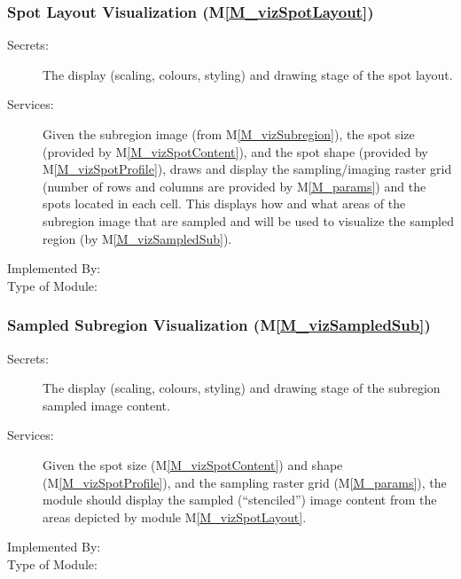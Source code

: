 \documentclass[12pt, titlepage]{article}
\newcommand{\mref}[1]{M\ref{#1}}
\begin{document}
\subsubsection{Spot Layout Visualization (\mref{M_vizSpotLayout})}
\begin{description}
\item[Secrets:]The display (scaling, colours, styling) and drawing stage of the spot layout.
\item[Services:]Given the subregion image (from \mref{M_vizSubregion}), 
  the spot size (provided by \mref{M_vizSpotContent}),
  and the spot shape (provided by \mref{M_vizSpotProfile}),
  draws and display the sampling/imaging raster grid
  (number of rows and columns are provided by \mref{M_params}) and
  the spots located in each cell. This displays how and what areas of the subregion
  image that are sampled and will be used to visualize the 
  sampled region (by \mref{M_vizSampledSub}).
\item[Implemented By:] \progname{}
\item[Type of Module:] 
\end{description}


\subsubsection{Sampled Subregion Visualization (\mref{M_vizSampledSub})}
\begin{description}
\item[Secrets:]The display (scaling, colours, styling) and drawing stage 
  of the subregion sampled image content.
\item[Services:]Given the spot size (\mref{M_vizSpotContent}) and
  shape (\mref{M_vizSpotProfile}), and the sampling raster grid (\mref{M_params}),
  the module should display the sampled (``stenciled'') image content from the areas
  depicted by module \mref{M_vizSpotLayout}.
\item[Implemented By:] \progname{}
\item[Type of Module:] 
\end{description}
\end{document}
